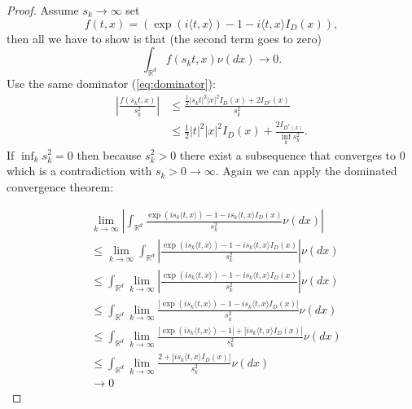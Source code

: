 \documentclass[a4paper,11pt]{article}
\begin{document}
\begin{proof}
    Assume $s_{k}\rightarrow \infty$ set
    \begin{equation}
        f(t,x) =  ( \exp ( i \langle t, x \rangle)-1-i \langle t, x \rangle I_{D} ( x ) ),
    \end{equation}
    then all we have to show is that (the second term goes to zero)
    \begin{equation}
        \int_{\mathbb{R}^{d}} f(s_{k}t,x) \nu( d x ) \rightarrow 0
        .
    \end{equation}
    Use the same dominator (\ref{eq:dominator}):
    \begin{align}
        \left|\frac{f(s_{k}t,x)}{s_{k}^{2}}\right| & \le \frac{\frac{1}{2} |s_{k} t|^{2} |x|^{2} I_{D}(x) + 2 I_{D^{c}}(x)}{ s_{k}^{2}}  \\
                                                   & \le \frac{1}{2} |t|^{2} |x|^{2} I_{D}(x) + \frac{2I_{D^{c}(x)}}{\inf_{k} s_{k}^{2}}
        .
    \end{align}
    If $\inf_{k} s_{k}^{2}= 0$ then because $s_k^{2}>0$ there exist a subsequence that
    converges to $0$ which is a contradiction with $s_{k}>0 \rightarrow \infty$.
    Again we can apply the dominated convergence theorem:

    \begin{align}
         & \lim_{k \to \infty} \left|\int_{\mathbb{R}^{d}} \frac{\exp ( i s_k \langle t, x \rangle)-1-i s_k \langle t, x \rangle I_{D} ( x )} {s_k^{2}} \nu( d x ) \right|                  \\
         & \le\lim_{k \to \infty} \int_{\mathbb{R}^{d}} \left|\frac{\exp ( i s_k \langle t, x \rangle)-1-i s_k \langle t, x \rangle I_{D} ( x )} {s_k^{2}}\right|  \nu( d x )               \\
         & \le \int_{\mathbb{R}^{d}}\lim_{k \to \infty} \left|\frac{\exp ( i s_k \langle t, x \rangle)-1-i s_k \langle t, x \rangle I_{D} ( x )} {s_k^{2}}\right|  \nu( d x )               \\
         & \le \int_{\mathbb{R}^{d}}\lim_{k \to \infty} \frac{\left|\exp ( i s_k \langle t, x \rangle)-1-i s_k \langle t, x \rangle I_{D} ( x )\right|} {s_k^{2}}  \nu( d x )               \\
         & \le \int_{\mathbb{R}^{d}}\lim_{k \to \infty} \frac{\left|\exp ( i s_k \langle t, x \rangle)-1\right|+ \left|i s_k \langle t, x \rangle I_{D} ( x )\right|} {s_k^{2}}  \nu( d x ) \\
         & \le \int_{\mathbb{R}^{d}}\lim_{k \to \infty} \frac{2+ \left|i s_k \langle t, x \rangle I_{D} ( x )\right|} {s_k^{2}}  \nu( d x )                                                 \\
         & \rightarrow 0
    \end{align}
\end{proof}
\end{document}
